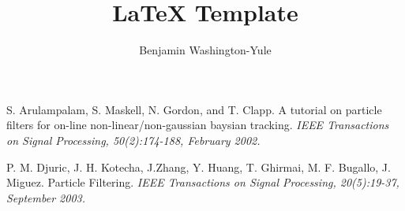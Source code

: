 \documentclass[a4paper, 12pt]{article}
\begin{document}
\title{LaTeX Template}
\author{Benjamin Washington-Yule}

\maketitle
% 








\begin{thebibliography}{99}
 S. Arulampalam, S. Maskell, N. Gordon, and T. Clapp. A tutorial
on particle filters for on-line non-linear/non-gaussian baysian tracking.
\emph{IEEE Transactions on Signal Processing, 50(2):174-188, February 2002.}

 P. M. Djuric, J. H. Kotecha, J.Zhang, Y. Huang, T. Ghirmai, M.
F. Bugallo, J. Miguez. Particle Filtering. \emph{IEEE Transactions on Signal
Processing, 20(5):19-37, September 2003.}
\end{thebibliography}
\end{document}
